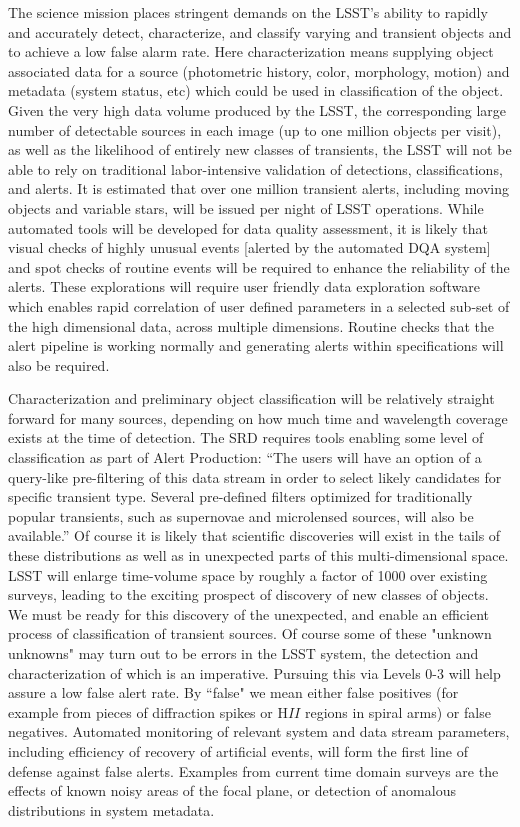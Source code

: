 \documentclass[SE,toc,lsstdraft]{lsstdoc}
\newcommand{\newtext}[1]{{\color{blue} #1}}
\begin{document}
The science mission places stringent demands on the LSST's ability to rapidly and accurately detect, characterize, and classify varying and transient objects and to achieve a low false alarm rate.  Here characterization means supplying object associated data for a source (photometric history, color, morphology, motion) and metadata (system status, etc) which could be used in classification of the object.  Given the very high data volume  produced by the LSST, the corresponding large number of detectable sources in each  image (up to one million objects per visit), as well as the  likelihood of entirely new classes of transients, the LSST will not be able  to rely on traditional labor-intensive validation of detections,  classifications, and alerts.  It is estimated that over one million transient alerts, including moving objects and variable stars, will be issued per night of LSST operations. While automated tools will be developed for data quality assessment, it is likely that visual checks of highly unusual events \newtext{[alerted by the automated DQA system]} and spot checks of routine events will be required to enhance the reliability of the alerts.
\newtext{These explorations will require user friendly data exploration software which enables rapid correlation of user defined parameters in a selected sub-set of the high dimensional data, across multiple dimensions.}
Routine checks that the alert pipeline is working normally and generating alerts within specifications will also be required.

Characterization and preliminary object classification will be relatively straight forward for many sources, depending on how much time and wavelength coverage exists at the time of detection. The SRD requires tools enabling some level of classification as part of Alert Production:  ``The users will have an option of a query-like pre-filtering of this data stream in order to select likely candidates for specific transient type. Several pre-defined filters optimized for traditionally popular transients, such as supernovae and microlensed sources, will also be available.''  Of course it is likely that scientific discoveries will exist in the tails of these distributions as well as in unexpected parts of this multi-dimensional space.  LSST will enlarge time-volume space by roughly a factor of 1000 over existing surveys, leading to the exciting prospect of discovery of new classes of objects.  We must be ready for this discovery of the unexpected, and enable an efficient process of classification of transient sources.  Of course some of these "unknown unknowns" may turn out to be errors in the LSST system, the detection and characterization of which is an imperative.  Pursuing this via Levels 0-3 will help assure a low false alert rate. By ``false" we mean either false positives (for example from pieces of diffraction spikes or H$II$ regions in spiral arms) or false negatives. Automated monitoring of relevant system and data stream parameters, including efficiency of recovery of artificial events, will form the first line of defense against false alerts. Examples from current time domain surveys are the effects of known noisy areas of the focal plane, or detection of anomalous distributions in system metadata.
\end{document}
